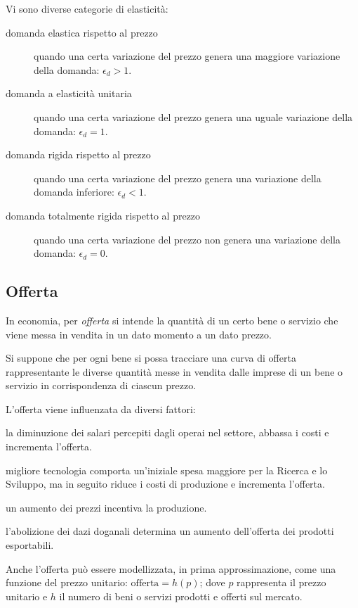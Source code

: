 Vi sono diverse categorie di elasticità:

\begin{description}
 \item [domanda elastica rispetto al prezzo]
quando una certa variazione del prezzo genera una maggiore variazione della 
domanda: \(\epsilon_d > 1\).
 \item [domanda a elasticità unitaria]
quando una certa variazione del prezzo genera una uguale variazione della 
domanda: \(\epsilon_d = 1\).
 \item [domanda rigida rispetto al prezzo]
quando una certa variazione del prezzo genera una variazione della 
domanda inferiore: \(\epsilon_d < 1\).
 \item [domanda totalmente rigida rispetto al prezzo]
quando una certa variazione del prezzo non genera una variazione della 
domanda: \(\epsilon_d = 0\).
\end{description}

\subsection{Offerta}
\label{subsec:modelli_offerta}

In economia, per \emph{offerta} si intende la quantità di un certo bene o 
servizio che viene messa in vendita in un dato momento a un dato prezzo.

Si suppone che per ogni bene si possa tracciare una curva di offerta 
rappresentante le diverse quantità messe in vendita dalle imprese di un bene 
o servizio in corrispondenza di ciascun prezzo.

L'offerta viene influenzata da diversi fattori:
\begin{description} [noitemsep]
 \item [Costi di produzione:] la diminuzione dei salari percepiti dagli 
operai nel settore, abbassa i costi e incrementa l'offerta.
 \item [Tecnologia:] migliore tecnologia comporta un'iniziale spesa maggiore 
per la Ricerca e lo Sviluppo, ma in seguito riduce i costi di produzione e 
incrementa l'offerta.
 \item [Prezzi:] un aumento dei prezzi incentiva la produzione.
 \item [Politiche governative:] l'abolizione dei dazi doganali determina un 
aumento dell'offerta dei prodotti esportabili.
\end{description}

Anche l'offerta può essere modellizzata, in prima approssimazione, come una 
funzione del prezzo unitario: \(\text{offerta} = h(p)\); dove \(p\) 
rappresenta il prezzo unitario e \(h\) il numero di beni o servizi prodotti e 
offerti sul mercato.


